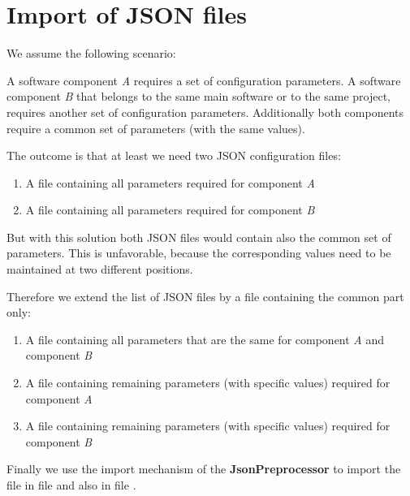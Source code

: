 
\newpage

\section{Import of JSON files}

We assume the following scenario:

A software component \textit{A} requires a set of configuration parameters. A software component \textit{B} that belongs to the same
main software or to the same project, requires another set of configuration parameters. Additionally both components
require a common set of parameters (with the same values).

The outcome is that at least we need two JSON configuration files:

\begin{enumerate}
   \item A file  containing all parameters required for component \textit{A}
   \item A file  containing all parameters required for component \textit{B}
\end{enumerate}

But with this solution both JSON files would contain also the common set of parameters. This is unfavorable, because
the corresponding values need to be maintained at two different positions.

Therefore we extend the list of JSON files by a file containing the common part only:

\begin{enumerate}
   \item A file  containing all parameters that are the same for component \textit{A} and component \textit{B}
   \item A file  containing remaining parameters (with specific values) required for component \textit{A}
   \item A file  containing remaining parameters (with specific values) required for component \textit{B}
\end{enumerate}

Finally we use the import mechanism of the \textbf{JsonPreprocessor} to import the file  in file  and also in
file .

